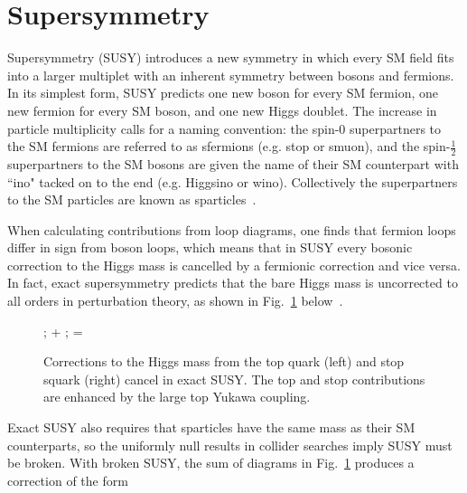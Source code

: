 \documentclass[12pt]{article}
\begin{document}
\section{Supersymmetry}
    Supersymmetry (SUSY) introduces a new symmetry in which every SM field fits into a larger multiplet with an inherent symmetry between bosons and fermions. In its simplest form, SUSY predicts one new boson for every SM fermion, one new fermion for every SM boson, and one new Higgs doublet. The increase in particle multiplicity calls for a naming convention: the spin-0 superpartners to the SM fermions are referred to as sfermions (e.g. stop or smuon), and the spin-$\frac{1}{2}$ superpartners to the SM bosons are given the name of their SM counterpart with ``ino" tacked on to the end (e.g. Higgsino or wino). Collectively the superpartners to the SM particles are known as sparticles~\cite{primer}.

    When calculating contributions from loop diagrams, one finds that fermion loops differ in sign from boson loops, which means that in SUSY every bosonic correction to the Higgs mass is cancelled by a fermionic correction and vice versa. In fact, exact supersymmetry predicts that the bare Higgs mass is uncorrected to all orders in perturbation theory, as shown in Fig.~\ref{exact_susy_correction} below~\cite{primer}.
    
    \noindent \begin{figure}[htbp] \begin{center}
        ;
    \quad + \quad
        ;
        \quad =  \quad
        \caption{Corrections to the Higgs mass from the top quark (left) and stop squark (right) cancel in exact SUSY. The top and stop contributions are enhanced by the large top Yukawa coupling.}
        \label{exact_susy_correction}
    \end{center} \end{figure}

    Exact SUSY also requires that sparticles have the same mass as their SM counterparts, so the uniformly null results in collider searches imply SUSY must be broken. With broken SUSY, the sum of diagrams in Fig.~\ref{exact_susy_correction} produces a correction of the form~\cite{craig}
\end{document}
